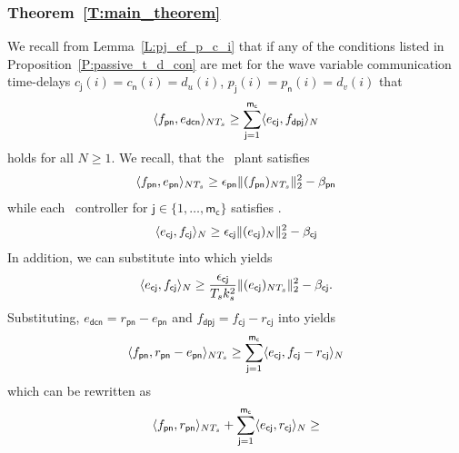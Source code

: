 \subsubsection{Theorem~\ref{T:main_theorem}}
\label{S:main_theorem}
\begin{IEEEproof}
We recall from Lemma~\ref{L:pj_ef_p_c_i} that if any of the conditions listed in
Proposition~\ref{P:passive_t_d_con} are met for the wave variable
communication time-delays $c_{\mathsf{j}}(i)=c_{\mathsf{n}}(i)=d_u(i)$, $p_{\mathsf{j}}(i)=p_{\mathsf{n}}(i)=d_v(i)$ that 
\begin{equation}
\label{E:main_assumption}
\langle f_{{\mathsf{pn}}},e_{{\mathsf{dcn}}} \rangle_{NT_s} \geq
\sum_{{\mathsf{j}}=1}^{{\mathsf{m_c}}} \langle e_{\mathsf{cj}},f_{\mathsf{dpj}} \rangle_N
\end{equation}
holds for all $N \geq 1$.
We recall, that the \sop\ plant satisfies
\begin{equation}
\label{E:sop_plant}
\langle f_{\mathsf{pn}},e_{\mathsf{pn}} \rangle_{NT_s} \geq \epsilon_{\mathsf{pn}} \|(f_{\mathsf{pn}})_{NT_s}\|_{2}^2 - \beta_{\mathsf{pn}}
\end{equation}
while each \sop\ controller for ${\mathsf{j}} \in \{1,\dots,{\mathsf{m_c}}\}$ satisfies
.
\begin{equation}
\label{E:sop_controller}
\langle e_{\mathsf{cj}},f_{\mathsf{cj}} \rangle_N \geq \epsilon_{\mathsf{cj}} \|(e_{\mathsf{cj}})_N\|_{2}^2 - \beta_{\mathsf{cj}}
\end{equation}
In addition, we can substitute  into
 which yields
\begin{equation}
\label{E:sop_controller_nts}
\langle e_{\mathsf{cj}},f_{\mathsf{cj}} \rangle_N \geq \frac{\epsilon_{\mathsf{cj}}}{T_s
  k_s^2}\|(e_{\mathsf{cj}})_{NT_s}\|_{2}^2 - \beta_{\mathsf{cj}}.
\end{equation}
Substituting, $e_{\mathsf{dcn}} = r_{\mathsf{pn}}-e_{\mathsf{pn}}$ and $f_{\mathsf{dpj}} = f_{\mathsf{cj}} -
r_{\mathsf{cj}}$ into  yields 
\begin{equation*}
\langle f_{\mathsf{pn}},r_{\mathsf{pn}}-e_{\mathsf{pn}} \rangle_{NT_s} \geq 
\sum_{\mathsf{j}=1}^{\mathsf{m_c}} \langle e_{\mathsf{cj}},f_{\mathsf{cj}}-r_{\mathsf{cj}} \rangle_N
\end{equation*}
which can be rewritten as
\begin{align}
\label{E:main_l2_inequality}
\innerprod{f_{\mathsf{pn}}}{r_{\mathsf{pn}}}_{NT_s} +
\sum_{\mathsf{j}=1}^{\mathsf{m_c}} \innerprod{e_{\mathsf{cj}}}{r_{\mathsf{cj}}}_N \geq \nonumber\\

\end{align}
\end{IEEEproof}
